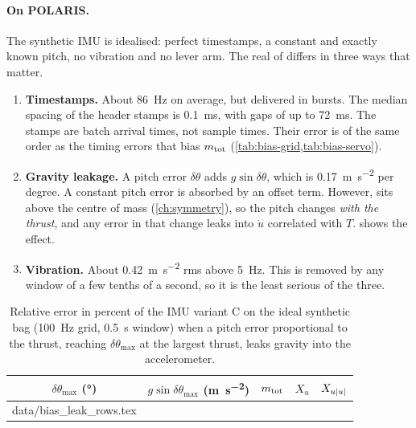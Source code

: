 \paragraph{On POLARIS.} The synthetic IMU is idealised: perfect timestamps, a constant and
exactly known pitch, no vibration and no lever arm. The real  of
 differs in three ways that matter.
\begin{enumerate}
  \item \textbf{Timestamps.} About \qty{86}{\hertz} on average, but delivered in bursts. The
        median spacing of the header stamps is \qty{0.1}{\milli\second}, with gaps of up to
        \qty{72}{\milli\second}. The stamps are batch arrival times, not sample times. Their
        error is of the same order as the timing errors that bias $m_\mathrm{tot}$
        (\cref{tab:bias-grid,tab:bias-servo}).
  \item \textbf{Gravity leakage.} A pitch error $\delta\theta$ adds $g\sin\delta\theta$, which is
        \qty{0.17}{\meter\per\second\squared} per degree. A constant pitch error is absorbed by an
        offset term. However,  sits above the
        centre of mass (\cref{ch:symmetry}), so the pitch changes \emph{with the thrust}, and any
        error in that change leaks into $\dot u$ correlated with $T$. 
        shows the effect.
  \item \textbf{Vibration.} About \qty{0.42}{\meter\per\second\squared} rms above
        \qty{5}{\hertz}. This is removed by any window of a few tenths of a second, so it is the
        least serious of the three.
\end{enumerate}

\begin{table}[htbp]
\centering
\caption{Relative error in percent of the IMU variant C on the ideal synthetic bag
(\qty{100}{\hertz} grid, \qty{0.5}{\second} window) when a pitch error proportional to the thrust,
reaching $\delta\theta_\mathrm{max}$ at the largest thrust, leaks gravity into the accelerometer.}
\label{tab:bias-leak}
\small
\begin{tabular}{@{}cc ccc@{}}
\toprule
$\delta\theta_\mathrm{max}$ (\unit{\degree}) & $g\sin\delta\theta_\mathrm{max}$ (\unit{\meter\per\second\squared}) & $m_\mathrm{tot}$ & $X_u$ & $X_{u|u|}$ \\
\midrule
{} data/bias_leak_rows.tex
\bottomrule
\end{tabular}
\end{table}
\FloatBarrier

